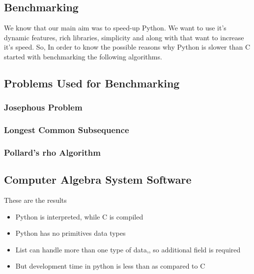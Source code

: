 \subsection{Benchmarking}
We know that our main aim was to speed-up Python. We want to use it's dynamic features, rich libraries, simplicity and along with that want to increase it's speed. So, In order to know the possible reasons why Python is slower than C started with benchmarking the following algorithms.
\subsection{Problems Used for Benchmarking}
\subsubsection{Josephous Problem}
\subsubsection{Longest Common Subsequence}
\subsubsection{Pollard's rho Algorithm}
\subsection{Computer Algebra System Software}
These are the results

\begin{itemize}
\item Python is interpreted, while C is compiled
\item Python has no primitives data types
\item List can handle more than one type of data,, so additional field is required
\item But development time in python is less than as compared to C
\end{itemize}





